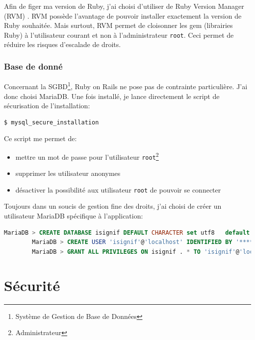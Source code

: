\documentclass[]{report}
\begin{document}
      Afin de figer ma version de Ruby, j’ai choisi d’utiliser de Ruby Version Manager (RVM) . RVM possède l’avantage de pouvoir installer exactement la version de Ruby souhaitée. Mais surtout, RVM permet de cloisonner les gem (librairies Ruby) à l’utilisateur courant et non à l’administrateur \verb|root|. Ceci permet de réduire les risques d’escalade de droits.

    \subsection{Base de donné}

      Concernant la SGBD\footnote{Système de Gestion de Base de Données}, Ruby on Rails ne pose pas de contrainte particulière. J’ai donc choisi MariaDB. Une fois installé, je lance directement le script de sécurisation de l’installation:

      \begin{scriptsize}
      \begin{lstlisting}[language=bash]
      $ mysql_secure_installation
      \end{lstlisting}
      \end{scriptsize}

      Ce script me permet de:

      \begin{itemize}
      \item mettre un mot de passe pour l’utilisateur \verb|root|\footnote{Administrateur}
      \item supprimer les utilisateur anonymes
      \item désactiver la possibilité aux utilisateur \verb|root| de pouvoir se connecter
      \end{itemize}

      Toujours dans un soucis de gestion fine des droits, j’ai choisi de créer un utilisateur MariaDB spécifique à l’application:

      \begin{scriptsize}
        \begin{lstlisting}[language=sql]
        MariaDB > CREATE DATABASE isignif DEFAULT CHARACTER set utf8   default COLLATE utf8_general_ci;
        MariaDB > CREATE USER 'isignif'@'localhost' IDENTIFIED BY '****';
        MariaDB > GRANT ALL PRIVILEGES ON isignif . * TO 'isignif'@'localhost';
        \end{lstlisting}
      \end{scriptsize}

\chapter{Sécurité}
\end{document}
